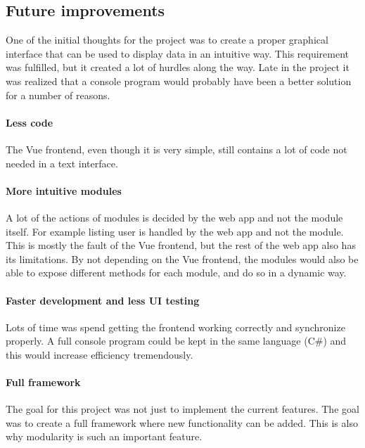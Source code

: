 \documentclass{article}
\begin{document}
\subsection{Future improvements}
One of the initial thoughts for the project was to create a proper graphical interface that can be used to display data in an intuitive way. This requirement was fulfilled, but it created a lot of hurdles along the way. Late in the project it was realized that a console program would probably have been a better solution for a number of reasons.

\paragraph{Less code} The Vue frontend, even though it is very simple, still contains a lot of code not needed in a text interface.

\paragraph{More intuitive modules} A lot of the actions of modules is decided by the web app and not the module itself. For example listing user is handled by the web app and not the module. This is mostly the fault of the Vue frontend, but the rest of the web app also has its limitations. By not depending on the Vue frontend, the modules would also be able to expose different methods for each module, and do so in a dynamic way.
    
\paragraph{Faster development and less UI testing} Lots of time was spend getting the frontend working correctly and synchronize properly. A full console program could be kept in the same language (C\#) and this would increase efficiency tremendously.

\paragraph{Full framework} The goal for this project was not just to implement the current features. The goal was to create a full framework where new functionality can be added. This is also why modularity is such an important feature.
\end{document}
